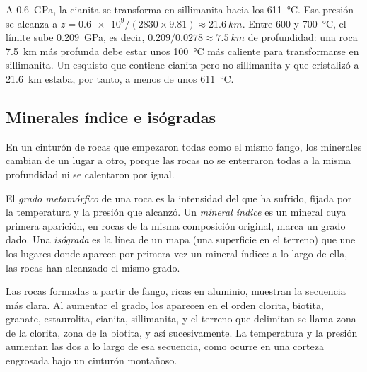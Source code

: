 \begin{example}\label{ex:g12:metamorphic-rocks:kysil}
A \qty{0.6}{GPa}, la cianita se transforma en sillimanita hacia los
\qty{611}{\celsius}. Esa presión se alcanza a $z = \num{0.6e9} / (2830
\times 9.81) \approx \qty{21.6}{km}$. Entre 600 y \qty{700}{\celsius}, el
límite sube \qty{0.209}{GPa}, es decir, $0.209/0.0278 \approx
\qty{7.5}{km}$ de profundidad: una roca \qty{7.5}{km} más profunda debe estar
unos \qty{100}{\celsius} más caliente para transformarse en sillimanita. Un
esquisto que contiene cianita pero no sillimanita y que cristalizó a
\qty{21.6}{km} estaba, por tanto, a menos de unos \qty{611}{\celsius}.
\end{example}

\subsection{Minerales índice e isógradas}

En un cinturón de rocas que empezaron todas como el mismo fango, los
minerales cambian de un lugar a otro, porque las rocas no se enterraron todas
a la misma profundidad ni se calentaron por igual.

\begin{definition}\label{def:g12:metamorphic-rocks:index-mineral}
El \emph{grado metamórfico} de una roca
es la intensidad del  que ha sufrido, fijada por la temperatura y
la presión que alcanzó. Un \emph{mineral índice}
es un mineral cuya primera aparición, en rocas de la misma composición
original, marca un grado dado. Una \emph{isógrada} es la
línea de un mapa (una superficie en el terreno) que une los lugares donde
aparece por primera vez un mineral índice: a lo largo de ella, las rocas han
alcanzado el mismo grado.
\end{definition}

Las rocas formadas a partir de fango, ricas en aluminio, muestran la
secuencia más clara. Al aumentar el grado, los  aparecen en el
orden clorita, biotita, granate, estaurolita, cianita, sillimanita, y el
terreno que delimitan se llama zona de la clorita, zona de la biotita, y así
sucesivamente. La temperatura y la presión aumentan las dos a lo largo de esa
secuencia, como ocurre en una corteza engrosada bajo un cinturón montañoso.

